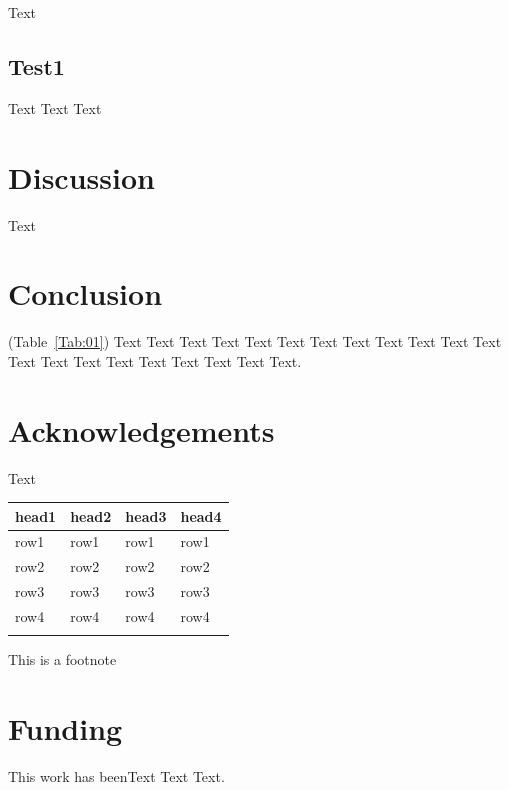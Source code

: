 \documentclass{bioinfo}
\begin{document}
\enlargethispage{6pt}

Text

\subsection{Test1}

Text Text  Text

\section{Discussion}

Text

\section{Conclusion}

(Table~\ref{Tab:01}) Text Text Text Text Text Text  Text Text Text
Text Text Text Text Text Text  Text Text Text Text Text Text.

\section*{Acknowledgements}

Text
\begin{table}[!t]
     {\begin{tabular}{@{}llll@{}}\toprule head1 &
    head2 & head3 & head4\\\midrule
    row1 & row1 & row1 & row1\\
    row2 & row2 & row2 & row2\\
    row3 & row3 & row3 & row3\\
    row4 & row4 & row4 & row4\\\botrule
    \end{tabular}}{This is a footnote}
\end{table}
    
\vspace*{-12pt}

\section*{Funding}

This work has beenText  Text Text.\vspace*{-12pt}


%
%
%
%
%
%
%

\end{document}
